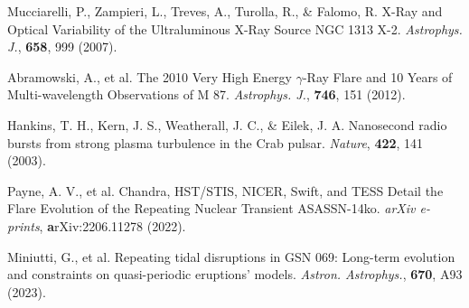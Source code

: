 \documentclass{nature_plusfigure}
\newcommand{\apj}{{Astrophys. J.}}
\newcommand{\aap}{{Astron. Astrophys.}}
\newcommand{\nat}{{Nature}}
\newcommand{\araa}{Annual Review of Astronomy and Astrophysics}
\begin{document}
\begin{thebibliography}{100}

  
 
 Mucciarelli, P., Zampieri, L., Treves, A., Turolla, R., \& Falomo, R. X-Ray and Optical Variability of the Ultraluminous X-Ray Source NGC 1313 X-2. \emph{\apj}, \textbf{658}, 999 (2007). 

 Abramowski, A., et al. The 2010 Very High Energy $\gamma$-Ray Flare and 10 Years of Multi-wavelength Observations of M 87. \emph{\apj}, \textbf{746}, 151 (2012). 

 Hankins, T. H., Kern, J. S., Weatherall, J. C., \& Eilek, J. A. Nanosecond radio bursts from strong plasma turbulence in the Crab pulsar. \emph{\nat}, \textbf{422}, 141 (2003). 

 Payne, A. V., et al. Chandra, HST/STIS, NICER, Swift, and TESS Detail the Flare Evolution of the Repeating Nuclear Transient ASASSN-14ko. \emph{arXiv e-prints}, \textbf arXiv:2206.11278 (2022). 

 Miniutti, G., et al. Repeating tidal disruptions in GSN 069: Long-term evolution and constraints on quasi-periodic eruptions' models. \emph{\aap}, \textbf{670}, A93 (2023). 

%
%
%


\end{thebibliography}
\end{document}
